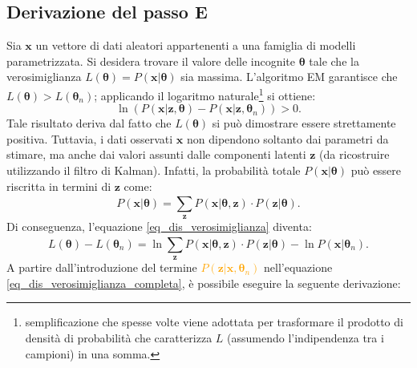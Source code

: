 \subsection{Derivazione del passo E}
Sia $\mathbf{x}$ un vettore di dati aleatori appartenenti a una famiglia di modelli parametrizzata. Si desidera trovare il valore delle incognite $\boldsymbol{\theta}$ tale che la verosimiglianza $L(\boldsymbol{\theta})=P(\mathbf{x} | \boldsymbol{\theta})$ sia massima. L'algoritmo EM garantisce che $L(\boldsymbol{\theta}) > L(\boldsymbol{\theta}_n)$; applicando il logaritmo naturale\footnote{semplificazione che spesse volte viene adottata per trasformare il prodotto di densità di probabilità che caratterizza $L$ (assumendo l'indipendenza tra i campioni) in una somma.} si ottiene:
\begin{equation}
	\ln(P(\mathbf{x}|\mathbf{z},\boldsymbol{\theta}) - P(\mathbf{x}|\mathbf{z},\boldsymbol{\theta}_n)) > 0.
	\label{eq_dis_verosimiglianza}
\end{equation}
Tale risultato deriva dal fatto che $L(\boldsymbol{\theta})$ si può dimostrare essere strettamente positiva. Tuttavia, i dati osservati $\mathbf{x}$ non dipendono soltanto dai parametri da stimare, ma anche dai valori assunti dalle componenti latenti $\mathbf{z}$ (da ricostruire utilizzando il filtro di Kalman). Infatti, la probabilità totale $P(\mathbf{x}|\boldsymbol{\theta})$ può essere riscritta in termini di $\mathbf{z}$ come:
\begin{equation}
	P(\mathbf{x}|\boldsymbol{\theta}) = \sum_{\mathbf{z}}^{}P(\mathbf{x}|\boldsymbol{\theta}, \mathbf{z})\cdot P(\mathbf{z}|\boldsymbol{\theta}).
\end{equation}
Di conseguenza, l'equazione \ref{eq_dis_verosimiglianza} diventa:
\begin{equation}
	L(\boldsymbol{\theta}) - L(\boldsymbol{\theta}_n) = \ln\sum_{\mathbf{z}}^{} P(\mathbf{x}|\boldsymbol{\theta}, \mathbf{z})\cdot P(\mathbf{z}|\boldsymbol{\theta}) - \ln P(\mathbf{x}|\boldsymbol{\theta}_n).
	\label{eq_dis_verosimiglianza_completa}
\end{equation}
A partire dall'introduzione del termine \textcolor{orange}{$P(\mathbf{z}|\mathbf{x},\boldsymbol{\theta}_n)$} nell'equazione \ref{eq_dis_verosimiglianza_completa}, è possibile eseguire la seguente derivazione:
